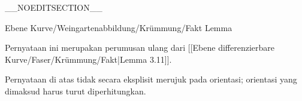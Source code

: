 __NOEDITSECTION__

{Ebene Kurve/Weingartenabbildung/Krümmung/Fakt}
{Lemma}
{}
{

\faktzusatz {}
\faktzusatz {}

}
{

Pernyataan ini merupakan perumusan ulang dari
[[Ebene differenzierbare Kurve/Faser/Krümmung/Fakt|Lemma 3.11]].

}

Pernyataan di atas tidak secara eksplisit merujuk pada orientasi; orientasi yang dimaksud harus turut diperhitungkan.

